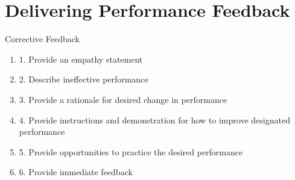 \section{Delivering Performance Feedback}
Corrective Feedback
\begin{enumerate} 
\item        1. Provide an empathy statement 
\item        2. Describe ineffective performance 
\item        3. Provide a rationale for desired change in performance 
\item        4. Provide instructions and demonstration for how to improve designated performance 
\item        5. Provide opportunities to practice the desired performance 
\item        6. Provide immediate feedback 
\end{enumerate}

